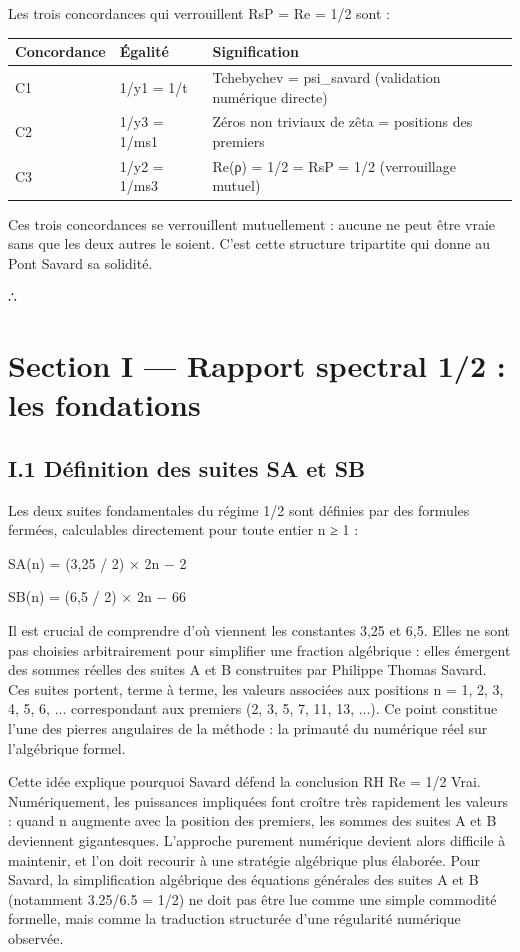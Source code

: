 \documentclass[11pt,a4paper]{article}
\begin{document}
Les trois concordances qui verrouillent RsP = Re = 1/2 sont :


\begin{longtable}{|p{}|p{}|p{}|}
\hline
Concordance & Égalité & Signification \\
\hline
C1 & 1/y1 = 1/t & Tchebychev = psi\_savard (validation numérique directe) \\
\hline
C2 & 1/y3 = 1/ms1 & Zéros non triviaux de zêta = positions des premiers \\
\hline
C3 & 1/y2 = 1/ms3 & Re(ρ) = 1/2 = RsP = 1/2 (verrouillage mutuel) \\
\hline
\end{longtable}


Ces trois concordances se verrouillent mutuellement : aucune ne peut être vraie sans que les deux autres le soient. C'est cette structure tripartite qui donne au Pont Savard sa solidité.

∴

\section{Section I — Rapport spectral 1/2 : les fondations}
\subsection{I.1 Définition des suites SA et SB}

Les deux suites fondamentales du régime 1/2 sont définies par des formules fermées, calculables directement pour toute entier n ≥ 1 :

SA(n) = (3,25 / 2) × 2n − 2

SB(n) = (6,5 / 2) × 2n − 66

Il est crucial de comprendre d'où viennent les constantes 3,25 et 6,5. Elles ne sont pas choisies arbitrairement pour simplifier une fraction algébrique : elles émergent des sommes réelles des suites A et B construites par Philippe Thomas Savard. Ces suites portent, terme à terme, les valeurs associées aux positions n = 1, 2, 3, 4, 5, 6, ... correspondant aux premiers (2, 3, 5, 7, 11, 13, ...). Ce point constitue l'une des pierres angulaires de la méthode : la primauté du numérique réel sur l'algébrique formel.

Cette idée explique pourquoi Savard défend la conclusion RH Re = 1/2 Vrai. Numériquement, les puissances impliquées font croître très rapidement les valeurs : quand n augmente avec la position des premiers, les sommes des suites A et B deviennent gigantesques. L'approche purement numérique devient alors difficile à maintenir, et l'on doit recourir à une stratégie algébrique plus élaborée. Pour Savard, la simplification algébrique des équations générales des suites A et B (notamment 3.25/6.5 = 1/2) ne doit pas être lue comme une simple commodité formelle, mais comme la traduction structurée d'une régularité numérique observée.
\end{document}

